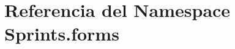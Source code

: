 \hypertarget{namespace_sprints_1_1forms}{}\section{Referencia del Namespace Sprints.\+forms}
\label{namespace_sprints_1_1forms}
